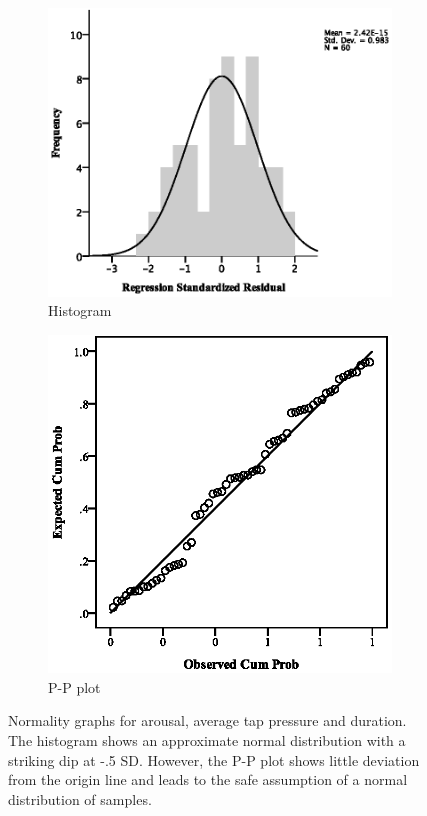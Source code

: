 \par\bigskip
\par\bigskip
\begin{figure}[ht]
\centering
\begin{subfigure}[b]{0.45\textwidth}
    \centering
    \includegraphics[width=\textwidth]{images/normality/aravg/HistArAvg.eps}
    \caption{Histogram}
    \label{fig:histaravg}
\end{subfigure}
\quad
\begin{subfigure}[b]{0.45\textwidth}
    \centering
    \includegraphics[width=\textwidth]{images/normality/aravg/PPArAvg.eps}
    \caption{P-P plot}
    \label{fig:pparavg}
\end{subfigure}
\caption{Normality graphs for arousal, average tap pressure and duration. The histogram shows an approximate normal distribution with a striking dip at -.5 SD. However, the P-P plot shows little deviation from the origin line and leads to the safe assumption of a normal distribution of samples.}
\end{figure}